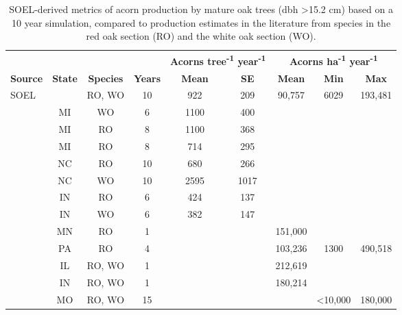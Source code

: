 \begin{table}[htbp]
  \centering
  \caption{SOEL-derived metrics of acorn production by mature oak trees (dbh \textgreater 15.2 cm) based on a 10 year simulation, compared to production estimates in the literature from species in the red oak section (RO) and the white oak section (WO).}
    \begin{tabular}{lcccccccc}
    \toprule
          &       &       &       & \multicolumn{2}{c}{\textbf{Acorns tree\textsuperscript{-1} year\textsuperscript{-1}}} & \multicolumn{3}{c}{\textbf{Acorns ha\textsuperscript{-1} year\textsuperscript{-1}}} \\
    \textbf{Source} & \textbf{State} & \textbf{Species} & \textbf{Years} & \textbf{Mean} & \textbf{SE} & \textbf{Mean} & \textbf{Min} & \textbf{Max} \\
        \midrule
    SOEL  &       & RO, WO & 10    & 922   & 209   & 90,757 & 6029  & 193,481 \\
    \citep{Christisen1955} & MI    & WO    & 6     & 1100  & 400   &       &       &  \\
    \citep{Sork1993} & MI    & RO    & 8     & 1100  & 368   &       &       &  \\
    \citep{Sork1993} & MI    & RO    & 8     & 714   & 295   &       &       &  \\
    \citep{Rose2012} & NC    & RO    & 10    & 680   & 266   &       &       &  \\
    \citep{Rose2012} & NC    & WO    & 10    & 2595  & 1017  &       &       &  \\
    \citep{Kellner2014b} & IN    & RO    & 6     & 424   & 137   &       &       &  \\
    \citep{Kellner2014b} & IN    & WO    & 6     & 382   & 147   &       &       &  \\
    \citep{Bundy1991} & MN    & RO    & 1     &       &       & 151,000 &       &  \\
    \citep{Steiner1995} & PA    & RO    & 4     &       &       & 103,236 & 1300  & 490,518 \\
    \citep{Lhotka2003} & IL    & RO, WO & 1     &       &       & 212,619 &       &  \\
    \citep{Rathfon2008a} & IN    & RO, WO & 1     &       &       & 180,214 &       &  \\
    \citep{Olson2015a} & MO    & RO, WO & 15    &       &       &       & \textless 10,000 & 180,000 \\
    \bottomrule
    \end{tabular}%
  \label{tab:4}%
\end{table}%
